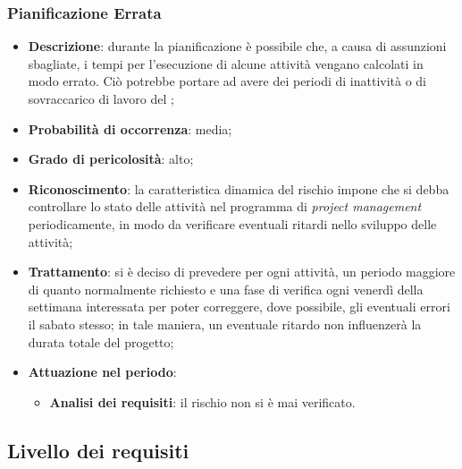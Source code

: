 		\subsubsection{Pianificazione Errata}
		\begin{itemize}
			\item \textbf{Descrizione}: durante la pianificazione è possibile che, a causa di assunzioni sbagliate, i tempi per l'esecuzione di alcune attività vengano calcolati in modo errato. Ciò potrebbe portare ad avere dei periodi di inattività o di sovraccarico di lavoro del ;
			\item \textbf{Probabilità di occorrenza}: media;
			\item \textbf{Grado di pericolosità}: alto;
			\item \textbf{Riconoscimento}: la caratteristica dinamica del rischio impone che si debba controllare lo stato delle attività nel programma di \emph{project management} periodicamente, in modo da verificare eventuali ritardi nello sviluppo delle attività; 
			\item \textbf{Trattamento}: si è deciso di prevedere per ogni attività, un periodo maggiore di quanto normalmente richiesto e una fase di verifica ogni venerdì della settimana interessata per poter correggere, dove possibile, gli eventuali errori il sabato stesso; in tale maniera, un eventuale ritardo non influenzerà la durata totale del progetto; 
			\item \textbf{Attuazione nel periodo}:
			\begin{itemize}
				\item \textbf{Analisi dei requisiti}:  il rischio non si è mai verificato.
			\end{itemize}
		\end{itemize}
	\subsection{Livello dei requisiti}
